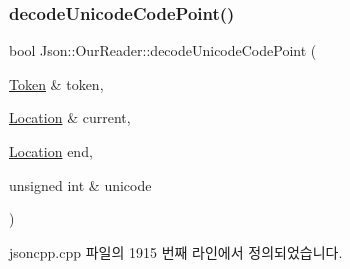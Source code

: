 \subsubsection{\texorpdfstring{decode\+Unicode\+Code\+Point()}{decodeUnicodeCodePoint()}}
{\footnotesize\ttfamily bool Json\+::\+Our\+Reader\+::decode\+Unicode\+Code\+Point (\begin{DoxyParamCaption}\item[{\hyperlink{class_json_1_1_our_reader_1_1_token}{Token} \&}]{token,  }\item[{\hyperlink{class_json_1_1_our_reader_a1bdc7bbc52ba87cae6b19746f2ee0189}{Location} \&}]{current,  }\item[{\hyperlink{class_json_1_1_our_reader_a1bdc7bbc52ba87cae6b19746f2ee0189}{Location}}]{end,  }\item[{unsigned int \&}]{unicode }\end{DoxyParamCaption})\hspace{0.3cm}{\ttfamily [private]}}



jsoncpp.\+cpp 파일의 1915 번째 라인에서 정의되었습니다.


